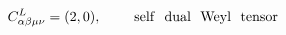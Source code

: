\begin{equation}
C^{L}_{\alpha \beta \mu \nu} =(2,0),~~~~~~~{\rm self~~ dual~~ Weyl~~ tensor}
\end{equation}

